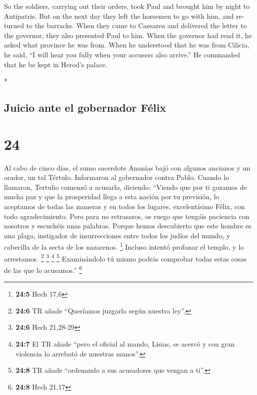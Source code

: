 \begin{paracol}{2}
\begin{otherlanguage}{english}
 So the soldiers, carrying out their orders, took Paul
and brought him by night to Antipatris.  But on the next
day they left the horsemen to go with him, and returned to the barracks.
 When they came to Caesarea and delivered the letter to
the governor, they also presented Paul to him.  When the
governor had read it, he asked what province he was from. When he
understood that he was from Cilicia, he said,  ``I will
hear you fully when your accusers also arrive.'' He commanded that he be
kept in Herod's palace.

\end{otherlanguage}

\switchcolumn[0]*

\hypertarget{juicio-ante-el-gobernador-fuxe9lix}{%
\subsection{Juicio ante el gobernador
Félix}\label{juicio-ante-el-gobernador-fuxe9lix}}

\hypertarget{section-46}{%
\section{24}\label{section-46}}

 Al cabo de cinco días, el sumo sacerdote Ananías bajó con
algunos ancianos y un orador, un tal Tértulo. Informaron al gobernador
contra Pablo.  Cuando lo llamaron, Tertulio comenzó a
acusarlo, diciendo: ``Viendo que por ti gozamos de mucha paz y que la
prosperidad llega a esta nación por tu previsión,  lo
aceptamos de todas las maneras y en todos los lugares, excelentísimo
Félix, con todo agradecimiento.  Pero para no retrasaros,
os ruego que tengáis paciencia con nosotros y escuchéis unas palabras.
 Porque hemos descubierto que este hombre es una plaga,
instigador de insurrecciones entre todos los judíos del mundo, y
cabecilla de la secta de los nazarenos. \footnote{\textbf{24:5} Hech
  17,6}  Incluso intentó profanar el templo, y lo
arrestamos. \footnote{\textbf{24:6} TR añade ``Queríamos juzgarlo según
  nuestra ley''.} \footnote{\textbf{24:6} Hech 21,28-29} 
\footnote{\textbf{24:7} El TR añade ``pero el oficial al mando, Lisias,
  se acercó y con gran violencia lo arrebató de nuestras manos''.}
 \footnote{\textbf{24:8} TR añade ``ordenando a sus
  acusadores que vengan a ti''.} Examinándolo tú mismo podrás comprobar
todas estas cosas de las que lo acusamos.'' \footnote{\textbf{24:8} Hech
  21,17}


\end{paracol}

